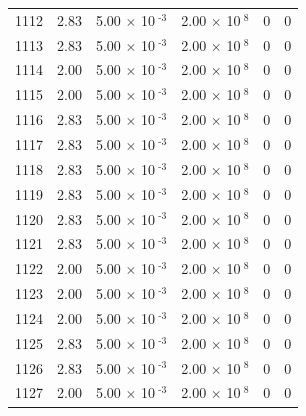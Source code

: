 \documentclass[a4paper,11pt]{article}
\begin{document}
\begin{center}
\begin{longtable}{|R{1.5cm}|R{2.4cm}|R{2.4cm}|R{2.4cm}|R{2.4cm}|R{2.4cm}|}
 1112 &   2.83  &         5.00 $\times$ 10$^{\text{          -3}}$  &         2.00 $\times$ 10$^{\text{           8}}$  & 0  & 0 \\
 1113 &   2.83  &         5.00 $\times$ 10$^{\text{          -3}}$  &         2.00 $\times$ 10$^{\text{           8}}$  & 0  & 0 \\
 1114 &   2.00  &         5.00 $\times$ 10$^{\text{          -3}}$  &         2.00 $\times$ 10$^{\text{           8}}$  & 0  & 0 \\
 1115 &   2.00  &         5.00 $\times$ 10$^{\text{          -3}}$  &         2.00 $\times$ 10$^{\text{           8}}$  & 0  & 0 \\
 1116 &   2.83  &         5.00 $\times$ 10$^{\text{          -3}}$  &         2.00 $\times$ 10$^{\text{           8}}$  & 0  & 0 \\
 1117 &   2.83  &         5.00 $\times$ 10$^{\text{          -3}}$  &         2.00 $\times$ 10$^{\text{           8}}$  & 0  & 0 \\
 1118 &   2.83  &         5.00 $\times$ 10$^{\text{          -3}}$  &         2.00 $\times$ 10$^{\text{           8}}$  & 0  & 0 \\
 1119 &   2.83  &         5.00 $\times$ 10$^{\text{          -3}}$  &         2.00 $\times$ 10$^{\text{           8}}$  & 0  & 0 \\
 1120 &   2.83  &         5.00 $\times$ 10$^{\text{          -3}}$  &         2.00 $\times$ 10$^{\text{           8}}$  & 0  & 0 \\
 1121 &   2.83  &         5.00 $\times$ 10$^{\text{          -3}}$  &         2.00 $\times$ 10$^{\text{           8}}$  & 0  & 0 \\
 1122 &   2.00  &         5.00 $\times$ 10$^{\text{          -3}}$  &         2.00 $\times$ 10$^{\text{           8}}$  & 0  & 0 \\
 1123 &   2.00  &         5.00 $\times$ 10$^{\text{          -3}}$  &         2.00 $\times$ 10$^{\text{           8}}$  & 0  & 0 \\
 1124 &   2.00  &         5.00 $\times$ 10$^{\text{          -3}}$  &         2.00 $\times$ 10$^{\text{           8}}$  & 0  & 0 \\
 1125 &   2.83  &         5.00 $\times$ 10$^{\text{          -3}}$  &         2.00 $\times$ 10$^{\text{           8}}$  & 0  & 0 \\
 1126 &   2.83  &         5.00 $\times$ 10$^{\text{          -3}}$  &         2.00 $\times$ 10$^{\text{           8}}$  & 0  & 0 \\
 1127 &   2.00  &         5.00 $\times$ 10$^{\text{          -3}}$  &         2.00 $\times$ 10$^{\text{           8}}$  & 0  & 0 \\

\end{longtable}
\end{center}
\end{document}
